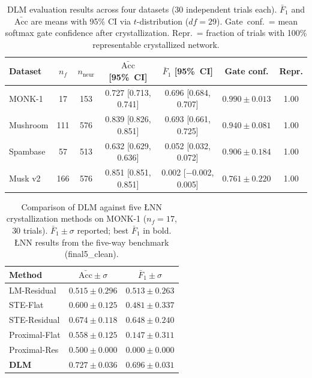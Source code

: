 
\begin{table}[t]
\caption{DLM evaluation results across four datasets (30 independent trials each).
         $\bar{F}_1$ and $\bar{\mathrm{Acc}}$ are means with 95\% CI via $t$-distribution
         ($df=29$). Gate~conf.\ = mean softmax gate confidence after crystallization.
         Repr.\ = fraction of trials with 100\% representable crystallized network.}
\label{tab:dlm_results}
\centering
\renewcommand{\arraystretch}{1.15}
\begin{tabular}{l cc cc cc}
\toprule
Dataset & $n_f$ & $n_\text{neur}$
        & $\bar{\mathrm{Acc}}$ [95\%~CI]
        & $\bar{F}_1$ [95\%~CI]
        & Gate conf.
        & Repr. \\
\midrule
MONK-1    & 17  & 153 & 0.727 [0.713, 0.741] & 0.696 [0.684, 0.707] & $0.990 \pm 0.013$ & 1.00 \\
Mushroom  & 111 & 576 & 0.839 [0.826, 0.851] & 0.693 [0.661, 0.725] & $0.940 \pm 0.081$ & 1.00 \\
Spambase  & 57  & 513 & 0.632 [0.629, 0.636] & 0.052 [0.032, 0.072] & $0.906 \pm 0.184$ & 1.00 \\
Musk v2   & 166 & 576 & 0.851 [0.851, 0.851] & 0.002 [$-$0.002, 0.005] & $0.761 \pm 0.220$ & 1.00 \\
\bottomrule
\end{tabular}
\end{table}


\begin{table}[t]
\caption{Comparison of DLM against five ŁNN crystallization methods on MONK-1
         ($n_f=17$, 30 trials). $\bar{F}_1 \pm \sigma$ reported; best $\bar{F}_1$ in bold.
         ŁNN results from the five-way benchmark (final5\_clean).}
\label{tab:dlm_vs_lnn_monk}
\centering
\renewcommand{\arraystretch}{1.15}
\begin{tabular}{l cc}
\toprule
Method & $\bar{\mathrm{Acc}} \pm \sigma$ & $\bar{F}_1 \pm \sigma$ \\
\midrule
LM-Residual     & $0.515 \pm 0.296$ & $0.513 \pm 0.263$ \\
STE-Flat        & $0.600 \pm 0.125$ & $0.481 \pm 0.337$ \\
STE-Residual    & $0.674 \pm 0.118$ & $0.648 \pm 0.240$ \\
Proximal-Flat   & $0.558 \pm 0.125$ & $0.147 \pm 0.311$ \\
Proximal-Res    & $0.500 \pm 0.000$ & $0.000 \pm 0.000$ \\
\midrule
\textbf{DLM}    & $\mathbf{0.727 \pm 0.036}$ & $\mathbf{0.696 \pm 0.031}$ \\
\bottomrule
\end{tabular}
\end{table}


